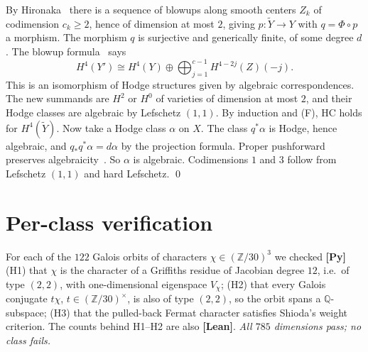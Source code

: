 \documentclass[11pt]{amsart}
\theoremstyle{remark}\newtheorem{remark}[theorem]{Remark}
\newcommand{\Q}{\mathbb{Q}}\newcommand{\PP}{\mathbb{P}}
\begin{document}
By Hironaka~\cite{Hir64} there is a sequence of blowups along smooth centers $Z_k$ of codimension
$c_k\ge2$, hence of dimension at most $2$, giving $p:\tilde Y\to Y$ with $q=\Phi\circ p$ a
morphism. The morphism $q$ is surjective and generically finite, of some degree $d$. The blowup
formula~\cite[Thm.~7.31]{Voi02} says
\[H^4(Y')\cong H^4(Y)\oplus\bigoplus_{j=1}^{c-1}H^{4-2j}(Z)(-j).\]
This is an isomorphism of Hodge structures given by algebraic correspondences. The new summands
are $H^2$ or $H^0$ of varieties of dimension at most $2$, and their Hodge classes are algebraic
by Lefschetz $(1,1)$. By induction and (F), HC holds for $H^4(\tilde Y)$. Now take a Hodge class
$\alpha$ on $X$. The class $q^*\alpha$ is Hodge, hence algebraic, and
$q_*q^*\alpha=d\alpha$ by the projection formula. Proper pushforward preserves
algebraicity~\cite[Ch.~19]{Ful98}. So $\alpha$ is algebraic. Codimensions $1$ and $3$ follow from
Lefschetz $(1,1)$ and hard Lefschetz. \qed

\section{Per-class verification}\label{sec:perclass}
For each of the $122$ Galois orbits of characters $\chi\in(\mathbb{Z}/30)^3$ we checked
\textbf{[Py]} (H1) that $\chi$ is the character of a Griffiths residue of Jacobian degree $12$,
i.e.\ of type $(2,2)$, with one-dimensional eigenspace $V_\chi$; (H2) that every Galois conjugate
$t\chi$, $t\in(\mathbb{Z}/30)^\times$, is also of type $(2,2)$, so the orbit spans a $\Q$-subspace;
(H3) that the pulled-back Fermat character satisfies Shioda's weight criterion. The counts behind
H1--H2 are also \textbf{[Lean]}. \emph{All $785$ dimensions pass; no class fails.}
\end{document}
